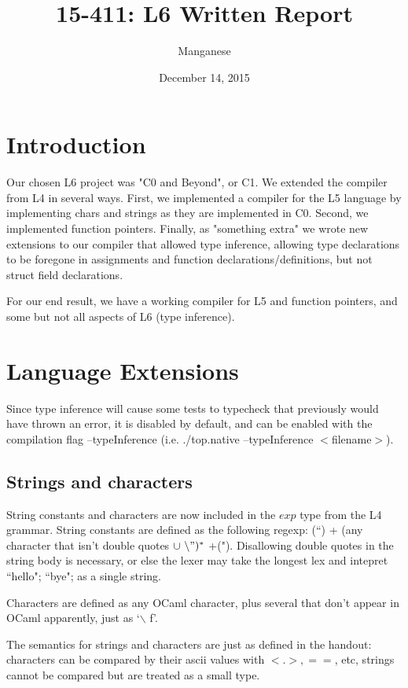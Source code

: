 \documentclass{article}
\title{15-411: L6 Written Report}
\author{Manganese}
\date{December 14, 2015}
\begin{document}
\maketitle

\section{Introduction}

Our chosen L6 project was "C0 and Beyond", or C1. We extended the compiler from L4 in several ways. First, we implemented a compiler for the L5 language by implementing chars and strings as they are implemented in C0. Second, we implemented function pointers. Finally, as "something extra" we wrote new extensions to our compiler that allowed type inference, allowing type declarations to be foregone in assignments and function declarations/definitions, but not struct field declarations.

For our end result, we have a working compiler for L5 and function pointers, and some but not all aspects of L6 (type inference).
\section{Language Extensions}

Since type inference will cause some tests to typecheck that previously would have thrown an error, it is disabled by default, and can be enabled with the compilation flag --typeInference (i.e. ./top.native --typeInference $<$filename$>$).\\

\subsection{Strings and characters}
String constants and characters are now included in the $exp$ type from the L4 grammar. String constants are defined as the following regexp: (``) + (any character that isn't double quotes $\cup \  \backslash")^*$ +("). Disallowing double quotes in the string body is necessary, or else the lexer may take the longest lex and intepret ``hello"; ``bye"; as a single string.

Characters are defined as any OCaml character, plus several that don't appear in OCaml apparently, just as `$\backslash$ f'.

The semantics for strings and characters are just as defined in the handout: characters can be compared by their ascii values with $<. >, ==$, etc, strings cannot be compared but are treated as a small type.
\end{document}
